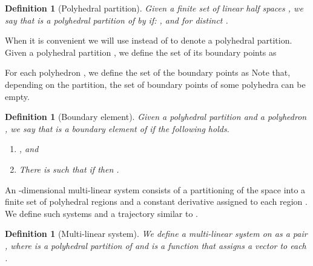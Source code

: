 \documentclass[copyright,creativecommons]{packages/eptcs}
\newtheorem{definition}[theorem]{Definition}
\begin{document}
\begin{definition}[Polyhedral partition] Given a finite set of linear half spaces 
, we say that  is a polyhedral partition of    by  if:  
 , and     for distinct .
\end{definition}
When it is convenient we will use  instead of  to denote a polyhedral partition. 
Given a polyhedral partition ,  we define  the  set of its  boundary points  as  
 


For each polyhedron , we define the set of the boundary points as 
Note that, depending on the partition,   the set of boundary points of  some polyhedra can be empty. 

\begin{definition}[Boundary element]
 Given a polyhedral partition  and a polyhedron , we say that  is a boundary element of  if the following holds.
\begin{enumerate}
 \item[(1)] , and  
 \item[(2)] There is   such that if   then .
\end{enumerate}

\end{definition}



An -dimensional  multi-linear system consists of a partitioning  of the space 
 into a finite set of polyhedral regions  and a constant derivative   assigned to each region . 
We define such systems and a trajectory similar to \cite{MP93}.


\begin{definition}[Multi-linear system] We define a  multi-linear system   on  as
a pair , where  
is a polyhedral partition of  and   is a function that assigns a vector  to each .  
\end{definition}

 
\end{document}
